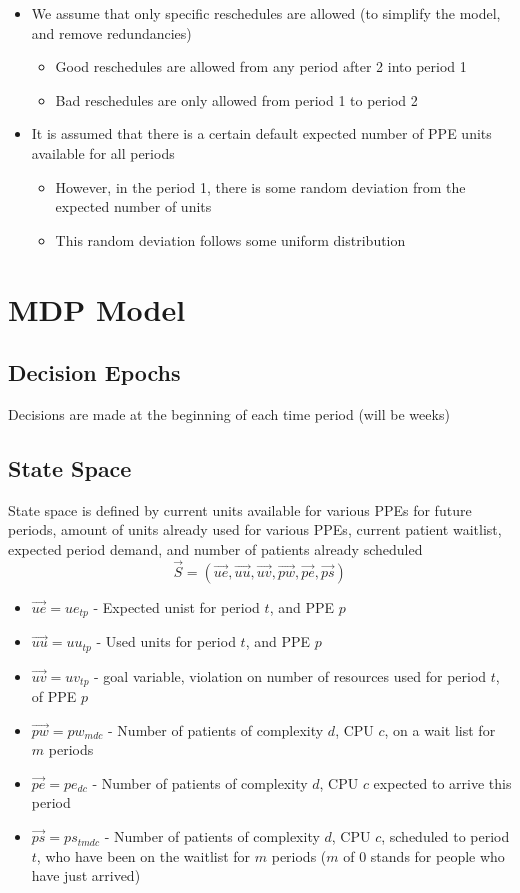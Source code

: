 \documentclass{article}
\begin{document}
\begin{itemize}
	\item We assume that only specific reschedules are allowed (to simplify the model, and remove  redundancies)
		\begin{itemize}
			\item Good reschedules are allowed from any period after 2 into period 1
			\item Bad reschedules are only allowed from period 1 to period 2
		\end{itemize}
	
	\item It is assumed that there is a certain default expected number of PPE units available for all periods
		\begin{itemize}
			\item However, in the period 1, there is some random deviation from the expected number of units
			\item This random deviation follows some uniform distribution
		\end{itemize}
\end{itemize}

\section{MDP Model}
\subsection{Decision Epochs}
Decisions are made at the beginning of each time period (will be weeks)

\subsection{State Space}
State space is defined by current units available for various PPEs for future periods, amount of units already used for various PPEs, current patient waitlist, expected period demand, and number of patients already scheduled
\[  \vec{S}  = (\vec{ue}, \vec{uu}, \vec{uv}, \vec{pw}, \vec{pe}, \vec{ps}) \]
\begin{itemize}
    \item $\vec{ue} = ue_{tp}$ - Expected unist for period $t$, and PPE $p$
    \item $\vec{uu} = uu_{tp}$ - Used units for period $t$, and PPE $p$
    \item $\vec{uv} = uv_{tp}$ - goal variable, violation on number of resources used for period $t$, of PPE $p$
    \item $\vec{pw} = pw_{mdc}$ - Number of patients of complexity $d$, CPU $c$, on a wait list for $m$ periods
    \item $\vec{pe} = pe_{dc}$ - Number of patients of complexity $d$, CPU $c$ expected to arrive this period
    \item $\vec{ps} = ps_{tmdc}$ - Number of patients of complexity $d$, CPU $c$, scheduled to period $t$, who have been on the waitlist for $m$ periods ($m$ of 0 stands for people who have just arrived)
\end{itemize}
\end{document}
